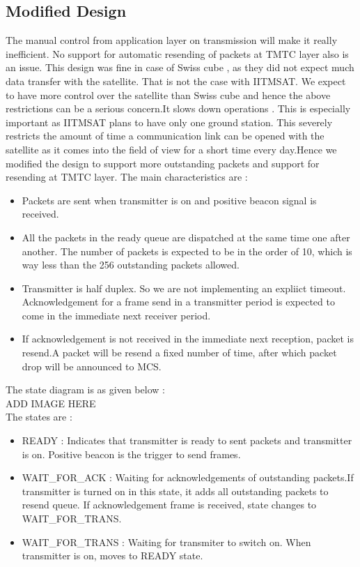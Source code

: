 \documentclass[BTech]{iitmdiss}
\begin{document}
\subsection{Modified Design}
The manual control from application layer on transmission will make it really inefficient. No support for automatic resending of packets at TMTC layer also is an issue. This design was fine in case of Swiss cube , as they did not expect much data  transfer with the satellite. That is not the case  with IITMSAT. We expect to have more control over the satellite than Swiss cube and hence the above restrictions can be a serious concern.It slows down operations . This is especially important as IITMSAT plans to have only one ground station. This severely restricts the amount of time a communication link can be opened with the satellite as it comes into the field of view for a short time every day.Hence we modified the design to support more outstanding packets and support for resending at TMTC layer. The main characteristics are :
\begin{itemize}
\item Packets are sent when transmitter is on and positive beacon signal is received.
\item All the packets in the ready queue are dispatched at the same time one after another. The number of packets is expected to be in the order of 10, which is way less than the 256 outstanding packets allowed.
\item Transmitter is half duplex. So we are not implementing an expliict timeout. Acknowledgement for a frame send in a transmitter period is expected to come in the immediate next receiver period.
\item If acknowledgement is not received in the immediate next reception, packet is resend.A packet will be resend a fixed number of time, after which packet drop will be announced to MCS.

\end{itemize}

The state diagram is as given below :
\\ ADD IMAGE HERE \\
The states are :
\begin{itemize}
\item READY : Indicates that transmitter is ready to sent packets and transmitter is on. Positive beacon is the trigger to send frames.
\item WAIT\_FOR\_ACK : Waiting for acknowledgements of outstanding packets.If transmitter is turned on in this state, it adds all outstanding packets  to resend queue. If acknowledgement frame is received, state changes to WAIT\_FOR\_TRANS.
\item WAIT\_FOR\_TRANS :  Waiting for transmiter to switch on. When transmitter is on, moves to READY state.
\end{itemize}
\end{document}
